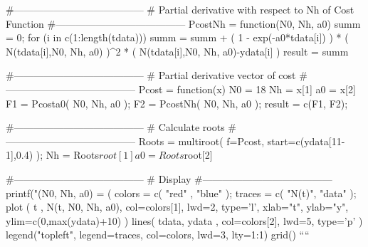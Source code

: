 #---------------------------------------
# Partial derivative with respect to Nh of Cost Function
#---------------------------------------
 PcostNh = function(N0, Nh, a0)
 {
   summ = 0;
   for (i in c(1:length(tdata)))
   {
     summ = summ + ( 1 - exp(-a0*tdata[i]) ) *
                   ( N(tdata[i],N0, Nh, a0) )^2 *
                   ( N(tdata[i],N0, Nh, a0)-ydata[i] )
   }
   result = summ
 }

#---------------------------------------
# Partial derivative vector of cost
#---------------------------------------
Pcost = function(x)
{
   N0 = 18
   Nh = x[1]
   a0 = x[2]
   F1 = Pcosta0( N0, Nh, a0 );
   F2 = PcostNh( N0, Nh, a0 );
   result = c(F1, F2);
}

#---------------------------------------
# Calculate roots
#---------------------------------------
 Roots = multiroot( f=Pcost, start=c(ydata[11-1],0.4) );
 Nh = Roots$root[1]
 a0 = Roots$root[2]

#---------------------------------------
# Display
#---------------------------------------
 printf("(N0, Nh, a0) = (%
 colors = c( "red" , "blue" );
 traces = c( "N(t)", "data" );
 plot ( t , N(t, N0, Nh, a0), col=colors[1], lwd=2, type='l', xlab="t", ylab="y", ylim=c(0,max(ydata)+10) )
 lines( tdata, ydata        , col=colors[2], lwd=5, type='p' )
 legend("topleft", legend=traces, col=colors, lwd=3, lty=1:1)
 grid()
````

